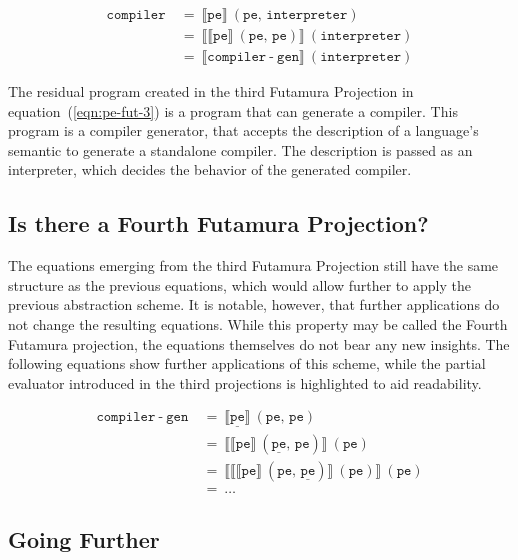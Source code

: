 \begin{align}
  \mathtt{compiler}\
  &=\ \llbracket \mathtt{pe} \rrbracket \ (\mathtt{pe},\, \mathtt{interpreter}) \\
  &=\ \llbracket \llbracket \mathtt{pe} \rrbracket \ (\mathtt{pe},\, \mathtt{pe}) \rrbracket \ (\mathtt{interpreter}) \label{eqn:pe-fut-3}\\
  &=\ \llbracket \mathtt{compiler\operatorname{-}gen} \rrbracket \ (\mathtt{interpreter})
\end{align}

The residual program created in the third Futamura Projection in equation~(\ref{eqn:pe-fut-3}) is a program that can generate a compiler.
This program is a compiler generator, that accepts the description of a language's semantic to generate a standalone compiler.
The description is passed as an interpreter, which decides the behavior of the generated compiler.


\subsection{Is there a Fourth Futamura Projection?}\label{sec:futamura-fourth}

The equations emerging from the third Futamura Projection still have the same structure as the previous equations, which would allow further to apply the previous abstraction scheme.
It is notable, however, that further applications do not change the resulting equations.
While this property may be called the Fourth Futamura projection, the equations themselves do not bear any new insights.
The following equations show further applications of this scheme, while the partial evaluator introduced in the third projections is highlighted to aid readability.

\begin{align}
  \mathtt{compiler\operatorname{-}gen}\
  &=\ \llbracket \mathtt{\underline{pe}} \rrbracket \ (\mathtt{pe},\, \mathtt{pe}) \\
  &=\ \llbracket \llbracket \mathtt{pe} \rrbracket \ (\mathtt{\underline{pe}},\, \mathtt{pe}) \rrbracket \ (\mathtt{pe}) \\
  &=\ \llbracket \llbracket \llbracket \mathtt{pe} \rrbracket\ (\mathtt{pe},\, \mathtt{\underline{pe}}) \rrbracket \ (\mathtt{pe}) \rrbracket \ (\mathtt{pe}) \\
  &=\ \ldots \nonumber
\end{align}



\subsection{Going Further}\label{sec:self-application}

